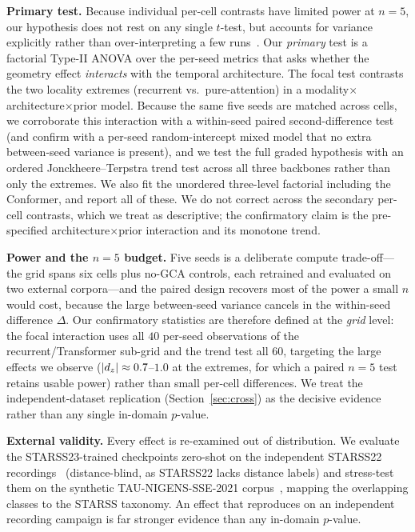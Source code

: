 \textbf{Primary test.} Because individual per-cell contrasts have limited power
at $n=5$, our hypothesis does not rest on any single $t$-test, but accounts for
variance explicitly rather than over-interpreting a few
runs~\cite{bouthillier2021variance}. Our \emph{primary} test is a factorial
Type-II ANOVA over the per-seed metrics that asks whether the geometry effect
\emph{interacts} with the temporal architecture. The focal test contrasts the two
locality extremes (recurrent vs.\ pure-attention) in a
modality$\times$architecture$\times$prior model. Because the same five seeds are
matched across cells, we corroborate this interaction with a within-seed paired
second-difference test (and confirm with a per-seed random-intercept mixed model
that no extra between-seed variance is present), and we test the full graded
hypothesis with an ordered Jonckheere--Terpstra trend test across all three
backbones rather than only the extremes. We also fit the unordered three-level
factorial including the Conformer, and report all of these. We do not correct
across the secondary per-cell contrasts, which we treat as descriptive; the
confirmatory claim is the pre-specified architecture$\times$prior interaction and
its monotone trend.

\textbf{Power and the $n=5$ budget.} Five seeds is a deliberate compute
trade-off---the grid spans six cells plus no-GCA controls, each retrained and
evaluated on two external corpora---and the paired design recovers most of the
power a small $n$ would cost, because the large between-seed variance cancels in
the within-seed difference $\Delta$. Our confirmatory statistics are therefore
defined at the \emph{grid} level: the focal interaction uses all $40$ per-seed
observations of the recurrent/Transformer sub-grid and the trend test all $60$,
targeting the large effects we observe ($|d_z|\approx0.7$--$1.0$ at the extremes,
for which a paired $n=5$ test retains usable power) rather than small per-cell
differences. We treat the independent-dataset replication (Section~\ref{sec:cross})
as the decisive evidence rather than any single in-domain $p$-value.

\textbf{External validity.} Every effect is re-examined out of distribution. We
evaluate the STARSS23-trained checkpoints zero-shot on the independent STARSS22
recordings~\cite{politis2022starss22} (distance-blind, as STARSS22 lacks distance
labels) and stress-test them on the synthetic TAU-NIGENS-SSE-2021
corpus~\cite{politis2021nigens}, mapping the overlapping classes to the STARSS
taxonomy. An effect that reproduces on an independent recording campaign is far
stronger evidence than any in-domain $p$-value.

